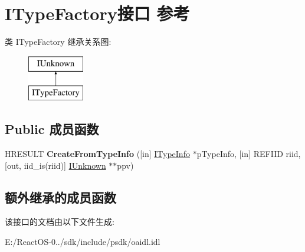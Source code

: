 \hypertarget{interface_i_type_factory}{}\section{I\+Type\+Factory接口 参考}
\label{interface_i_type_factory}
类 I\+Type\+Factory 继承关系图\+:\begin{figure}[H]
\begin{center}
\leavevmode
\includegraphics[height=2.000000cm]{interface_i_type_factory}
\end{center}
\end{figure}
\subsection*{Public 成员函数}
\begin{DoxyCompactItemize}
\item 
\mbox{\label{interface_i_type_factory_aea764a34a75a5becc2b7bd9ff4ae476a}} 
H\+R\+E\+S\+U\+LT {\bfseries Create\+From\+Type\+Info} (\mbox{[}in\mbox{]} \hyperlink{interface_i_type_info}{I\+Type\+Info} $\ast$p\+Type\+Info, \mbox{[}in\mbox{]} R\+E\+F\+I\+ID riid, \mbox{[}out, iid\+\_\+is(riid)\mbox{]} \hyperlink{interface_i_unknown}{I\+Unknown} $\ast$$\ast$ppv)
\end{DoxyCompactItemize}
\subsection*{额外继承的成员函数}


该接口的文档由以下文件生成\+:\begin{DoxyCompactItemize}
\item 
E\+:/\+React\+O\+S-\/0../sdk/include/psdk/oaidl.\+idl\end{DoxyCompactItemize}

